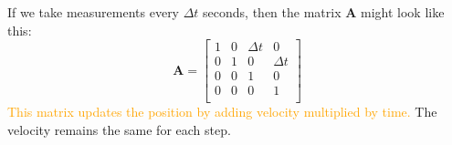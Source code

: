 \begin{example}
If we take measurements every $\Delta t$ seconds, then the matrix $\textbf{A}$ might look like this:
\[\mathbf{A} = \begin{bmatrix}
   1 & 0 & \Delta t & 0\\
   0 & 1 & 0 & \Delta t\\   
   0 & 0 & 1 & 0\\
   0 & 0 & 0 & 1\\
\end{bmatrix}\]
\textcolor{orange}{This matrix updates the position by adding velocity multiplied by time.} The velocity remains the same for each step.


\end{example}




